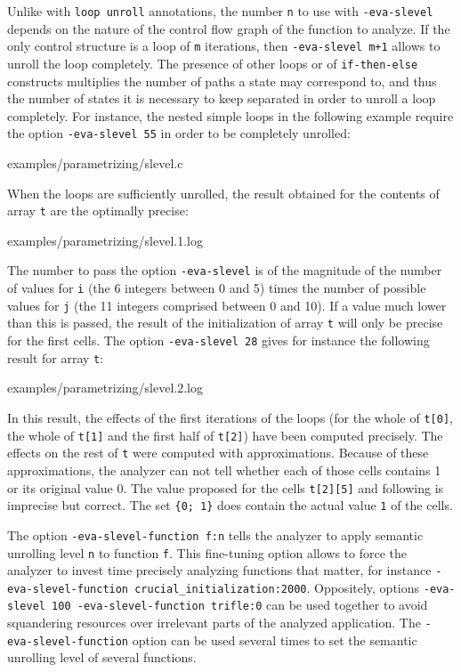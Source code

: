 \documentclass[web]{frama-c-book}
\begin{document}
Unlike with \lstinline|loop unroll| annotations, the number \lstinline|n|
to use with \lstinline|-eva-slevel| depends on the nature of the control flow
graph of the function to analyze.
If the only control structure is a loop of \lstinline|m| iterations,
then \texttt{-eva-slevel \textsf{m+1}} allows to unroll the loop completely.
The presence of other loops or of \lstinline|if-then-else| constructs
multiplies the number of paths a state may correspond to,
and thus the number of states it is necessary to keep separated
in order to unroll a loop completely.
For instance, the
nested simple loops in the following example require the
option \lstinline|-eva-slevel 55| in order to be completely unrolled:

  {examples/parametrizing/slevel.c}

When the loops are sufficiently unrolled, the result obtained for the
contents of array \lstinline|t| are the optimally precise:

  {examples/parametrizing/slevel.1.log}

The number to pass the option \lstinline|-eva-slevel|  is of the magnitude of
the number of values for \lstinline|i| (the 6 integers between 0 and 5)
times the number of possible values for \lstinline|j| (the 11
integers comprised between 0 and 10). If a value much lower than
this is passed, the result of the initialization of array \lstinline|t|
will only be precise for the first cells. The option \lstinline|-eva-slevel 28|
gives for instance the following result for array \lstinline|t|:

  {examples/parametrizing/slevel.2.log}

In this result, the effects of the first iterations of the loops
(for the whole of \lstinline|t[0]|, the whole of \lstinline|t[1]| and the first
half of \lstinline|t[2]|) have been computed precisely. The
effects on the rest of \lstinline|t| were computed with
approximations. Because of these approximations, the analyzer can not
tell whether each of those cells contains 1 or its original value 0.
The value proposed for the cells \lstinline|t[2][5]| and following
is imprecise but correct. The set \lstinline|{0; 1}| does
contain the actual value \lstinline|1| of the cells.

The option \lstinline|-eva-slevel-function f:n| tells the analyzer to apply 
semantic unrolling level \lstinline|n| to function \lstinline|f|.
This fine-tuning option allows to 
force the analyzer to invest time precisely analyzing functions that matter,
for instance \lstinline|-eva-slevel-function crucial_initialization:2000|.
Oppositely, options \lstinline|-eva-slevel 100 -eva-slevel-function trifle:0| 
can be used together to avoid squandering resources over irrelevant parts of 
the analyzed application. The \lstinline|-eva-slevel-function| option can be used 
several times to set the semantic unrolling level of several functions.
\end{document}
